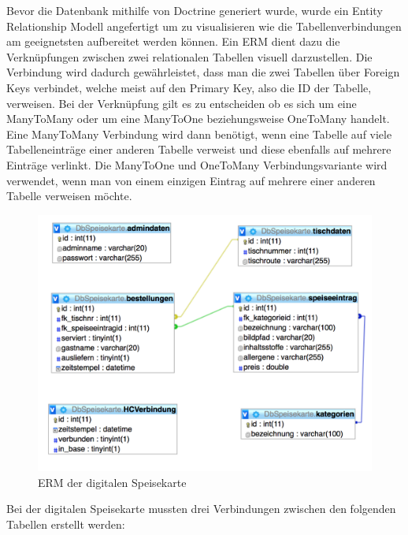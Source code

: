 Bevor die Datenbank mithilfe von Doctrine generiert wurde, wurde ein Entity Relationship Modell angefertigt um zu visualisieren wie die Tabellenverbindungen am geeignetsten aufbereitet werden können. Ein ERM dient dazu die Verknüpfungen zwischen zwei relationalen Tabellen visuell darzustellen. Die Verbindung wird dadurch gewährleistet, dass man die zwei Tabellen über Foreign Keys verbindet, welche meist auf den Primary Key, also die ID der Tabelle, verweisen. Bei der Verknüpfung gilt es zu entscheiden ob es sich um eine ManyToMany oder um eine ManyToOne beziehungsweise OneToMany handelt. Eine ManyToMany Verbindung wird dann benötigt, wenn eine Tabelle auf viele Tabelleneinträge einer anderen Tabelle verweist und diese ebenfalls auf mehrere Einträge verlinkt. Die ManyToOne und OneToMany Verbindungsvariante wird verwendet, wenn man von einem einzigen Eintrag auf mehrere einer anderen Tabelle verweisen möchte.
			\begin{figure}[H]
			\begin{centering}
			\includegraphics[width = 1\textwidth]{Bilder/Jok_ERM.png}
			\par\end{centering}
			\caption{ERM der digitalen Speisekarte}
			\label{ERM der digitalen Speisekarte}
			\end{figure}Bei der digitalen Speisekarte mussten drei Verbindungen zwischen den folgenden Tabellen erstellt werden:
